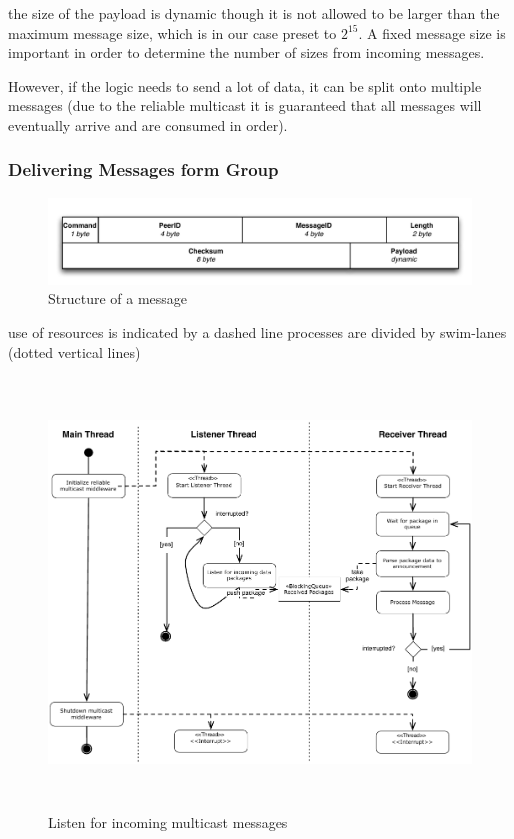 the size of the payload is dynamic though it is not allowed to be larger than the maximum message size, which is in our case preset to $2^15$. A fixed message size is important in order to determine the number of sizes from incoming messages. 


However, if the logic needs to send a lot of data, it can be split onto multiple messages (due to the reliable multicast it is guaranteed that all messages will eventually arrive and are consumed in order).


\subsubsection{Delivering Messages form Group}


\begin{figure}[htbp]
    \centering
        \includegraphics[width=.9\textwidth]{figures/message.pdf}
    \caption{Structure of a message}
    \label{fig:figures_announcement}
\end{figure}

use of resources  is indicated by a dashed line 
processes are divided by swim-lanes (dotted vertical lines)

\begin{figure}[htbp]
    \centering
        \includegraphics[height=4.5in]{figures/receivePackets.pdf}
    \caption{Listen for incoming multicast messages}
    \label{fig:figures_processReceivePackage}
\end{figure}

